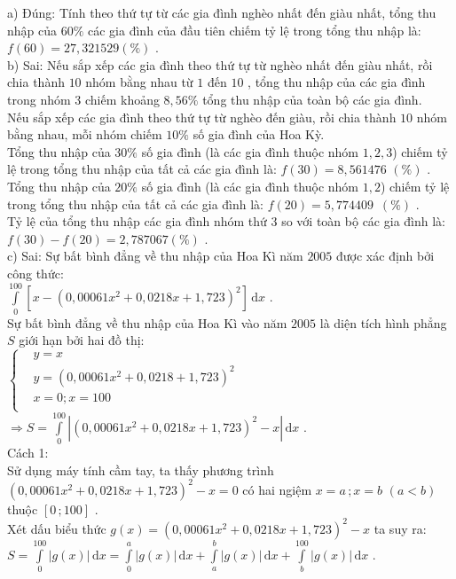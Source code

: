\begin{ex}
{a) Đúng: Tính theo thứ tự từ các gia đình nghèo nhất đến giàu nhất, tổng thu nhập của $60\%$ các gia đình của đầu tiên chiếm tỷ lệ trong tổng thu nhập là: $f\left(60\right)=27,321529(\%)$ .\\
b) Sai: Nếu sắp xếp các gia đình theo thứ tự từ nghèo nhất đến giàu nhất, rồi chia thành $10$ nhóm bằng nhau từ $1$ đến $10$ , tổng thu nhập của các gia đình trong nhóm $3$ chiếm khoảng $8,56\%$ tổng thu nhập của toàn bộ các gia đình.\\
Nếu sắp xếp các gia đình theo thứ tự từ nghèo đến giàu, rồi chia thành $10$ nhóm bằng nhau, mỗi nhóm chiếm $10\%$ số gia đình của Hoa Kỳ.\\
Tổng thu nhập của $30\%$ số gia đình (là các gia đình thuộc nhóm $1,2,3$) chiếm tỷ lệ trong tổng thu nhập của tất cả các gia đình là: $f\left(30\right)=8,561476\,\,\left(\%\right)$ .\\
Tổng thu nhập của $20\%$ số gia đình (là các gia đình thuộc nhóm $1,2$) chiếm tỷ lệ trong tổng thu nhập của tất cả các gia đình là: $f\left(20\right)=5,774409\,\,\,\left(\%\right)$ .\\
Tỷ lệ của tổng thu nhập các gia đình nhóm thứ $3$ so với toàn bộ các gia đình là:\\
$f\left(30\right)-f\left(20\right)=2,787067(\%)$ .\\
c) Sai: Sự bất bình đẳng về thu nhập của Hoa Kì năm $2005$ được xác định bởi công thức:\\
$\displaystyle\int\limits_0^{100}{\left[x-\left(0,00061x^2+0,0218x+1,723\right)^2\right]\mathrm{\,d}x}$ .\\
Sự bất bình đẳng về thu nhập của Hoa Kì vào năm $2005$ là diện tích hình phẳng $S$ giới hạn bởi hai đồ thị:\\
$\left\{\begin{aligned}
& y=x\\ 
& y=\left(0,00061x^2+0,0218+1,723\right)^2\\ 
& x=0;x=100\\ 
\end{aligned}\right.$ $\Rightarrow S=\displaystyle\int\limits_0^{100}{\left|\left(0,00061x^2+0,0218x+1,723\right)^2-x\right|\mathrm{\,d}x}$ .\\
Cách 1:\\
Sử dụng máy tính cầm tay, ta thấy phương trình $\left(0,00061x^2+0,0218x+1,723\right)^2-x=0$ có hai ngiệm $x=a\,;x=b\,\,\left(a<b\right)$ thuộc $\left[0\,;100\right]$ .\\
Xét dấu biểu thức $g(x)=\left(0,00061x^2+0,0218x+1,723\right)^2-x$ ta suy ra:\\ $S=\displaystyle\int\limits_0^{100}{\left| g(x)\right|\mathrm{\,d}x}=\displaystyle\int\limits_0^a{\left| g(x)\right|\mathrm{\,d}x}+\displaystyle\int\limits_a^b{\left| g(x)\right|\mathrm{\,d}x}+\displaystyle\int\limits_b^{100}{\left| g(x)\right|\mathrm{\,d}x}$ .\\
}
\end{ex}
